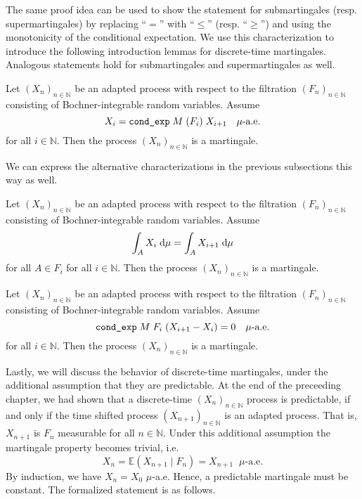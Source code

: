 The same proof idea can be used to show the statement for submartingales (resp. supermartingales) by replacing ``$=$'' with ``$\le$'' (resp. ``$\ge$'') and using the monotonicity of the conditional expectation. We use this characterization to introduce the following introduction lemmas for discrete-time martingales. Analogous statements hold for submartingales and supermartingales as well.

\begin{lemma}
  Let $(X_n)_{n \in \mathbb{N}}$ be an adapted process with respect to the filtration $(F_n)_{n \in \mathbb{N}}$ consisting of Bochner-integrable random variables. Assume 
  \[
  \normalfont X_i = \texttt{cond\_exp} \; M \; (F_i) \; X_{i+1} \quad\mu\textrm{-a.e.} 
  \]
  for all $i \in \mathbb{N}$. Then the process $(X_n)_{n \in \mathbb{N}}$ is a martingale.
\end{lemma}

We can express the alternative characterizations in the previous subsections this way as well.

\begin{lemma}
  Let $(X_n)_{n \in \mathbb{N}}$ be an adapted process with respect to the filtration $(F_n)_{n \in \mathbb{N}}$ consisting of Bochner-integrable random variables. 
  Assume 
  \[
  \normalfont \int_A X_i \;\textrm{d}\mu = \int_A X_{i+1} \;\textrm{d}\mu
  \] 
  for all $A \in F_i$ for all $i \in \mathbb{N}$. Then the process $(X_n)_{n \in \mathbb{N}}$ is a martingale.
\end{lemma}

\begin{lemma}
  Let $(X_n)_{n \in \mathbb{N}}$ be an adapted process with respect to the filtration $(F_n)_{n \in \mathbb{N}}$ consisting of Bochner-integrable random variables. Assume 
  \[
  \normalfont \texttt{cond\_exp} \; M \; F_i \; (X_{i+1} - X_i) = 0 \quad\mu\textrm{-a.e.}
  \] 
  for all $i \in \mathbb{N}$. Then the process $(X_n)_{n \in \mathbb{N}}$ is a martingale.
\end{lemma}

Lastly, we will discuss the behavior of discrete-time martingales, under the additional assumption that they are predictable. At the end of the preceeding chapter, we had shown that a discrete-time $(X_n)_{n \in \mathbb{N}}$ process is predictable, if and only if the time shifted process $(X_{n + 1})_{n \in \mathbb{N}}$ is an adapted process. That is, $X_{n+1}$ is $F_n$ measurable for all $n \in \mathbb{N}$. Under this additional assumption the martingale property becomes trivial, i.e.
\[
	X_n = \mathbb{E}(X_{n+1} \;\vert\; F_n) = X_{n+1} \;\;\mu\textrm{-a.e.}
\]
By induction, we have $X_n = X_0$ $\mu$-a.e. Hence, a predictable martingale must be constant. The formalized statement is as follows.

